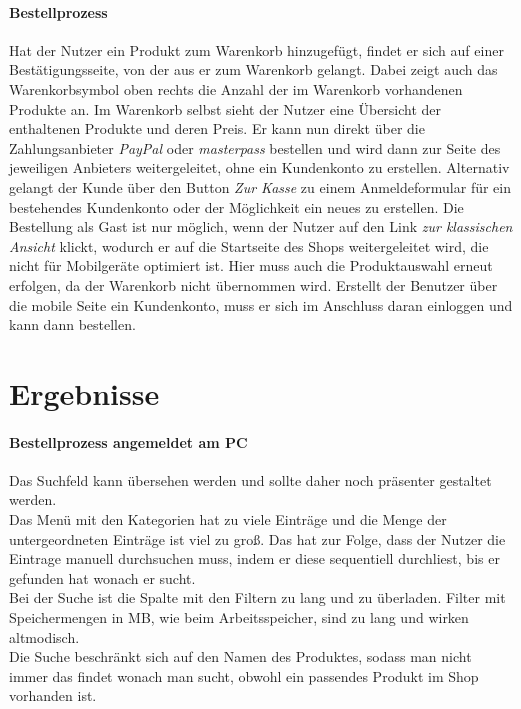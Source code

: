 \documentclass[	12pt, 
				a4paper, 
				BCOR=10mm, %
				DIV=12, 
				parskip=half, %
				headings=small, %
				twoside, %
				ngerman,
				bibliography=totoc,index=totoc, listof=totoc,
				numbers=noendperiod
				]{scrbook} %
\theoremstyle{plain}%
\theoremstyle{definition}
\theoremstyle{remark}
\begin{document}
\paragraph{Bestellprozess} Hat der Nutzer ein Produkt zum Warenkorb hinzugefügt, findet er sich auf einer Bestätigungsseite, von der aus er zum Warenkorb gelangt. Dabei zeigt auch das Warenkorbsymbol oben rechts die Anzahl der im Warenkorb vorhandenen Produkte an. Im Warenkorb selbst sieht der Nutzer eine Übersicht der enthaltenen Produkte und deren Preis. Er kann nun direkt über die Zahlungsanbieter \textit{PayPal} oder \textit{masterpass} bestellen und wird dann zur Seite des jeweiligen Anbieters weitergeleitet, ohne ein Kundenkonto zu erstellen. Alternativ gelangt der Kunde über den Button \textit{Zur Kasse} zu einem Anmeldeformular für ein bestehendes Kundenkonto oder der Möglichkeit ein neues zu erstellen. Die Bestellung als Gast ist nur möglich, wenn der Nutzer auf den Link \textit{zur klassischen Ansicht} klickt, wodurch er auf die Startseite des Shops weitergeleitet wird, die nicht für Mobilgeräte optimiert ist. Hier muss auch die Produktauswahl erneut erfolgen, da der Warenkorb nicht übernommen wird. Erstellt der Benutzer über die mobile Seite ein Kundenkonto, muss er sich im Anschluss daran einloggen und kann dann bestellen.

\section{Ergebnisse}

\paragraph{Bestellprozess angemeldet am PC}
Das Suchfeld kann übersehen werden und sollte daher noch präsenter gestaltet werden.\\
Das Menü mit den Kategorien hat zu viele Einträge und die Menge der untergeordneten Einträge ist viel zu groß. Das hat zur Folge, dass der Nutzer die Eintrage manuell durchsuchen muss, indem er diese sequentiell durchliest, bis er gefunden hat wonach er sucht.\\
Bei der Suche ist die Spalte mit den Filtern zu lang und zu überladen. Filter mit Speichermengen in MB, wie beim Arbeitsspeicher, sind zu lang und wirken altmodisch.\\
Die Suche beschränkt sich auf den Namen des Produktes, sodass man nicht immer das findet wonach man sucht, obwohl ein passendes Produkt im Shop vorhanden ist.
\end{document}

